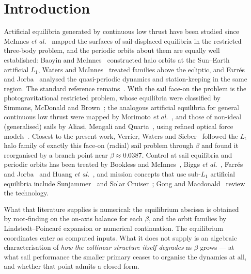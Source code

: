 \documentclass[pdflatex,sn-mathphys-num]{sn-jnl}
\begin{document}
\maketitle

\section{Introduction}

Artificial equilibria generated by continuous low thrust have been studied since
McInnes \emph{et al.}~\cite{mcinnes1994} mapped the surfaces of sail-displaced
equilibria in the restricted three-body problem, and the periodic orbits about
them are equally well established: Baoyin and McInnes~\cite{baoyin2006}
constructed halo orbits at the Sun--Earth artificial $L_1$, Waters and
McInnes~\cite{waters2007} treated families above the ecliptic, and Farr\'es and
Jorba~\cite{farres2010,farres2016} analysed the quasi-periodic dynamics and
station-keeping in the same region. The standard reference
remains~\cite{mcinnes1999}. With the sail face-on the problem is the
photogravitational restricted problem, whose equilibria were classified by
Simmons, McDonald and Brown~\cite{simmons1985}; the analogous artificial
equilibria for general continuous low thrust were mapped by Morimoto
\emph{et al.}~\cite{morimoto2007}, and those of non-ideal (generalised) sails by
Aliasi, Mengali and Quarta~\cite{aliasi2011,aliasi2012}, using refined optical
force models~\cite{mengali2007,dachwald2013}. Closest to the present work,
Verrier, Waters and Sieber~\cite{verrier2014} followed the $L_1$ halo family of
exactly this face-on (radial) sail problem through $\beta$ and found it
reorganised by a branch point near $\beta\approx0.0387$. Control at sail
equilibria and periodic orbits has been treated by Bookless and
McInnes~\cite{bookless2006,bookless2008}, Biggs \emph{et al.}~\cite{biggs2009},
Farr\'es and Jorba~\cite{farres2008,farres2014} and Huang
\emph{et al.}~\cite{huang2020}, and mission concepts that use sub-$L_1$
artificial equilibria include Sunjammer~\cite{heiligers2014sunjammer} and Solar
Cruiser~\cite{pezent2021}; Gong and Macdonald~\cite{gong2019} review the
technology.

What that literature supplies is numerical: the equilibrium abscissa is obtained
by root-finding on the on-axis balance for each $\beta$, and the orbit families
by Lindstedt--Poincar\'e expansion or numerical continuation. The equilibrium
coordinates enter as computed inputs. What it does not supply is an algebraic
characterisation of \emph{how the collinear structure itself degrades} as $\beta$
grows --- at what sail performance the smaller primary ceases to organise the
dynamics at all, and whether that point admits a closed form.
\end{document}
